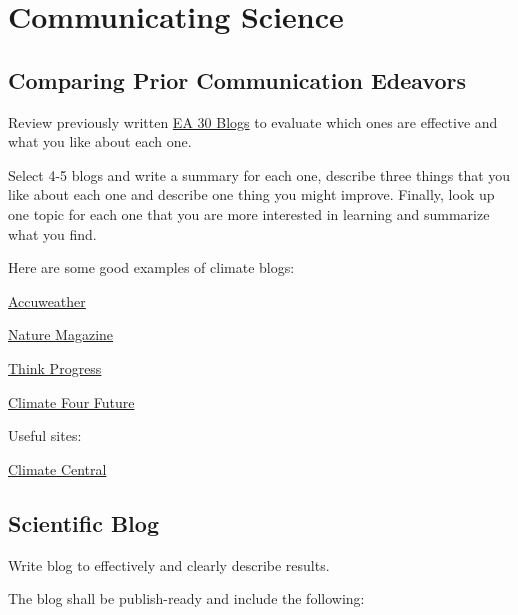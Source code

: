 \documentclass{article}\usepackage[]{graphicx}\usepackage[]{color}
\newenvironment{itemize*}%
  {\begin{itemize}%
    \setlength{\itemsep}{0pt}%
    \setlength{\parskip}{0pt}}%
  {\end{itemize}}
\begin{document}
\section{Communicating Science}

\subsection{Comparing Prior Communication Edeavors}

Review previously written \href{https://marclos.github.io/Climate_Change_Narratives/}{EA 30 Blogs} to evaluate which ones are effective and what you like about each one. 

Select 4-5 blogs and write a summary for each one, describe three things that you like about each one and describe one thing you might improve. Finally, look up one topic for each one that you are more interested in learning and summarize what you find.

Here are some good examples of climate blogs:

\begin{itemize*}
  \item \href{http://www.accuweather.com/en/weather-blogs/climatechange}{Accuweather}
  \item \href{http://blogs.nature.com/climatefeedback/}{Nature Magazine}
  \item \href{https://thinkprogress.org/tagged/climate}{Think Progress}
  \item \href{http://climateofourfuture.org/}{Climate Four Future}
\end{itemize*}

Useful sites: 

\begin{itemize*}
  \item \href{http://www.climatecentral.org/news/the-heat-is-on}{Climate Central}
  \item 
\end{itemize*}


\subsection{Scientific Blog}

Write blog to effectively and clearly describe results.

The blog shall be publish-ready and include the following: 
\end{document}
